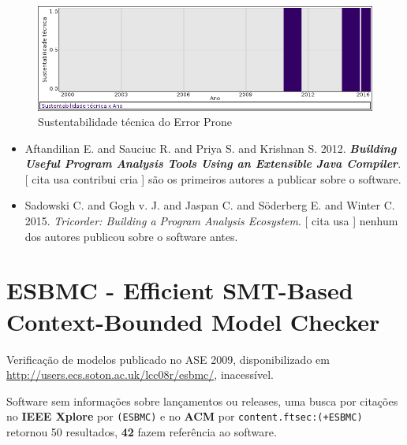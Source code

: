 \begin{figure}[h]
  \center
  \includegraphics[scale=0.50]{imagens/softwares-charts/error-prone.png}
  \caption{Sustentabilidade técnica do Error Prone}
\end{figure}


\begin{itemize}
\item Aftandilian E. and Sauciuc R. and Priya S. and Krishnan S.
      2012.
        \textbf{\textit{ Building Useful Program Analysis Tools Using an Extensible Java Compiler}}.
      [
          cita
          usa
          contribui
          cria
      ]
são os primeiros autores a publicar sobre o software.
\item Sadowski C. and Gogh v. J. and Jaspan C. and Söderberg E. and Winter C.
      2015.
        \textit{ Tricorder: Building a Program Analysis Ecosystem}.
      [
          cita
          usa
      ]
nenhum dos autores publicou sobre o software antes.
\end{itemize}
\section{ESBMC - Efficient SMT-Based Context-Bounded Model Checker}

Verificação de modelos
publicado no ASE 2009,
disponibilizado em \url{http://users.ecs.soton.ac.uk/lcc08r/esbmc/},
inacessível.

Software sem informações sobre lançamentos ou releases,
uma busca por citações no {\bf IEEE Xplore} por
\texttt{(ESBMC)}
e no {\bf ACM} por
\texttt{content.ftsec:(+ESBMC)}
retornou
50 resultados,
{\bf 42} fazem referência ao software.


